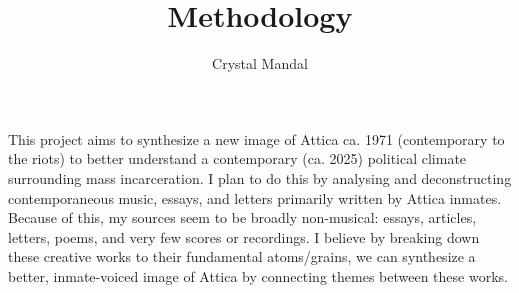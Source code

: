\documentclass[12pt,letterpaper]{article}
\title{\vspace*{-72pt}Methodology}
\author{Crystal Mandal}
\date{}
\begin{document}
\maketitle

This project aims to synthesize a new image of Attica ca. 1971 
(contemporary to the riots) to better understand a contemporary (ca. 2025) 
political climate surrounding mass incarceration. I plan to do this 
by analysing and deconstructing contemporaneous music, essays, and letters 
primarily written by Attica inmates. Because of this, my sources seem to 
be broadly non-musical: essays, articles, letters, poems, and very few 
scores or recordings. I believe by breaking down these creative works 
to their fundamental atoms/grains, we can synthesize a better, inmate-voiced 
image of Attica by connecting themes between these works. 


\end{document}
